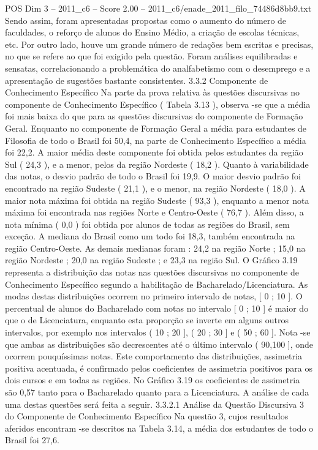 \begin{textsample}{POS Dim 3 – 2011\_c6 – Score 2.00 – 2011\_c6/enade\_2011\_filo\_74486d8bb9.txt}
Sendo assim, foram apresentadas propostas como o aumento do número de faculdades, o reforço de alunos do Ensino Médio, a criação de escolas técnicas, etc.
Por outro lado, houve um grande número de redações bem escritas e precisas, no que se refere ao que foi exigido pela questão.
Foram análises equilibradas e sensatas, correlacionando a problemática do analfabetismo com o desemprego e a apresentação de sugestões bastante consistentes. 3.3.2 Componente de Conhecimento Específico Na parte da prova relativa às questões discursivas no componente de Conhecimento Específico ( Tabela 3.13 ), observa -se que a média foi mais baixa do que para as questões discursivas do componente de Formação Geral.
Enquanto no componente de Formação Geral a média para estudantes de Filosofia de todo o Brasil foi 50,4, na parte de Conhecimento Específico a média foi 22,2.
A maior média deste componente foi obtida pelos estudantes da região Sul ( 24,3 ), e a menor, pelos da região Nordeste ( 18,2 ).
Quanto à variabilidade das notas, o desvio padrão de todo o Brasil foi 19,9.
O maior desvio padrão foi encontrado na região Sudeste ( 21,1 ), e o menor, na região Nordeste ( 18,0 ).
A maior nota máxima foi obtida na região Sudeste ( 93,3 ), enquanto a menor nota máxima foi encontrada nas regiões Norte e Centro-Oeste ( 76,7 ).
Além disso, a nota mínima ( 0,0 ) foi obtida por alunos de todas as regiões do Brasil, sem exceção.
A mediana do Brasil como um todo foi 18,3, também encontrada na região Centro-Oeste.
As demais medianas foram : 24,2 na região Norte ; 15,0 na região Nordeste ; 20,0 na região Sudeste ; e 23,3 na região Sul.
O Gráfico 3.19 representa a distribuição das notas nas questões discursivas no componente de Conhecimento Específico segundo a habilitação de Bacharelado/Licenciatura.
As modas destas distribuições ocorrem no primeiro intervalo de notas, [ 0 ; 10 ].
O percentual de alunos do Bacharelado com notas no intervalo [ 0 ; 10 ] é maior do que o de Licenciatura, enquanto esta proporção se inverte em alguns outros intervalos, por exemplo nos intervalos ( 10 ; 20 ], ( 20 ; 30 ] e ( 50 ; 60 ].
Nota -se que ambas as distribuições são decrescentes até o último intervalo ( 90,100 ], onde ocorrem pouquíssimas notas.
Este comportamento das distribuições, assimetria positiva acentuada, é confirmado pelos coeficientes de assimetria positivos para os dois cursos e em todas as regiões.
No Gráfico 3.19 os coeficientes de assimetria são 0,57 tanto para o Bacharelado quanto para a Licenciatura.
A análise de cada uma destas questões será feita a seguir. 3.3.2.1 Análise da Questão Discursiva 3 do Componente de Conhecimento Específico Na questão 3, cujos resultados aferidos encontram -se descritos na Tabela 3.14, a média dos estudantes de todo o Brasil foi 27,6.

\end{textsample}
